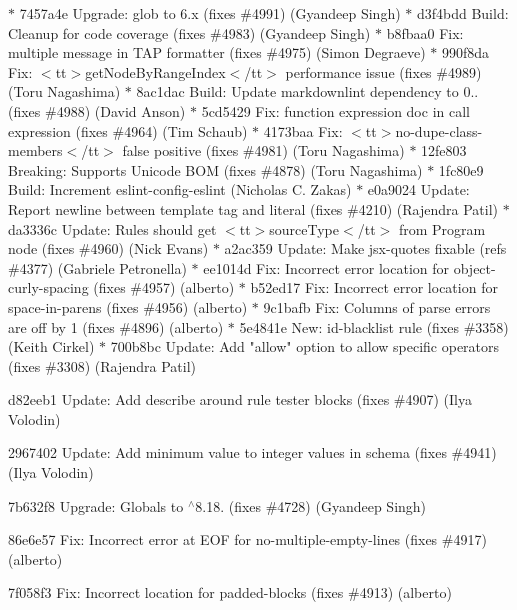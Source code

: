 \begin{DoxyItemize}
\texorpdfstring{$\ast$}{*} 7457a4e Upgrade\+: glob to 6.\+x (fixes \#4991) (\+Gyandeep Singh) \texorpdfstring{$\ast$}{*} d3f4bdd Build\+: Cleanup for code coverage (fixes \#4983) (\+Gyandeep Singh) \texorpdfstring{$\ast$}{*} b8fbaa0 Fix\+: multiple message in TAP formatter (fixes \#4975) (\+Simon Degraeve) \texorpdfstring{$\ast$}{*} 990f8da Fix\+: $<$tt$>$get\+Node\+By\+Range\+Index$<$/tt$>$ performance issue (fixes \#4989) (\+Toru Nagashima) \texorpdfstring{$\ast$}{*} 8ac1dac Build\+: Update markdownlint dependency to 0.. (fixes \#4988) (\+David Anson) \texorpdfstring{$\ast$}{*} 5cd5429 Fix\+: function expression doc in call expression (fixes \#4964) (\+Tim Schaub) \texorpdfstring{$\ast$}{*} 4173baa Fix\+: $<$tt$>$no-\/dupe-\/class-\/members$<$/tt$>$ false positive (fixes \#4981) (\+Toru Nagashima) \texorpdfstring{$\ast$}{*} 12fe803 Breaking\+: Supports Unicode BOM (fixes \#4878) (\+Toru Nagashima) \texorpdfstring{$\ast$}{*} 1fc80e9 Build\+: Increment eslint-\/config-\/eslint (\+Nicholas C. Zakas) \texorpdfstring{$\ast$}{*} e0a9024 Update\+: Report newline between template tag and literal (fixes \#4210) (\+Rajendra Patil) \texorpdfstring{$\ast$}{*} da3336c Update\+: Rules should get $<$tt$>$source\+Type$<$/tt$>$ from Program node (fixes \#4960) (\+Nick Evans) \texorpdfstring{$\ast$}{*} a2ac359 Update\+: Make jsx-\/quotes fixable (refs \#4377) (\+Gabriele Petronella) \texorpdfstring{$\ast$}{*} ee1014d Fix\+: Incorrect error location for object-\/curly-\/spacing (fixes \#4957) (alberto) \texorpdfstring{$\ast$}{*} b52ed17 Fix\+: Incorrect error location for space-\/in-\/parens (fixes \#4956) (alberto) \texorpdfstring{$\ast$}{*} 9c1bafb Fix\+: Columns of parse errors are off by 1 (fixes \#4896) (alberto) \texorpdfstring{$\ast$}{*} 5e4841e New\+: \textquotesingle{}id-\/blacklist\textquotesingle{} rule (fixes \#3358) (\+Keith Cirkel) \texorpdfstring{$\ast$}{*} 700b8bc Update\+: Add "{}allow"{} option to allow specific operators (fixes \#3308) (Rajendra Patil)
\item d82eeb1 Update\+: Add describe around rule tester blocks (fixes \#4907) (Ilya Volodin)
\item 2967402 Update\+: Add minimum value to integer values in schema (fixes \#4941) (Ilya Volodin)
\item 7b632f8 Upgrade\+: Globals to \texorpdfstring{$^\wedge$}{\string^}8.18. (fixes \#4728) (Gyandeep Singh)
\item 86e6e57 Fix\+: Incorrect error at EOF for no-\/multiple-\/empty-\/lines (fixes \#4917) (alberto)
\item 7f058f3 Fix\+: Incorrect location for padded-\/blocks (fixes \#4913) (alberto)

\end{DoxyItemize}
